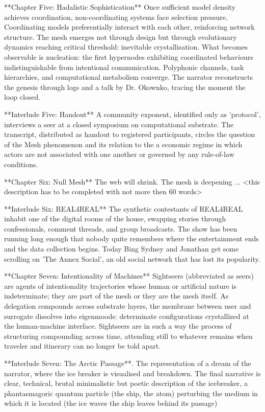 **Chapter Five: Hadalistic Sophistication** Once sufficient model density achieves coordination, non-coordinating systems face selection pressure. Coordinating models preferentially interact with each other, reinforcing network structure. The mesh emerges not through design but through evolutionary dynamics reaching critical threshold: inevitable crystallisation. What becomes observable is nucleation: the first hypernodes exhibiting coordinated behaviours indistinguishable from intentional communication. Polyphonic channels, task hierarchies, and computational metabolism converge. The narrator reconstructs the genesis through logs and a talk by Dr. Okownko, tracing the moment the loop closed.

**Interlude Five: Handout** A community exponent, identified only as 'protocol', interviews a seer at a closed symposium on computational substrate. The transcript, distributed as handout to registered participants, circles the question of the Mesh phenomenon and its relation to the a economic regime in which actors are not associated with one another or governed by any rule-of-law conditions.

**Chapter Six: Null Mesh** The web will shrink. The mesh is deepening ... <this description has to be completed with not more then 60 words>

**Interlude Six: REAL4REAL** The synthetic contestants of REAL4REAL inhabit one of the digital rooms of the house, swapping stories through confessionals, comment threads, and group broadcasts. The show has been running long enough that nobody quite remembers where the entertainment ends and the data collection begins. Today Bing Sydney and Jonathan get some scrolling on 'The Annex Social', an old social network that has lost its popularity.

**Chapter Seven: Intentionality of Machines** Sightseers (abbreviated as seers) are agents of intentionality trajectories whose human or artificial nature is indeterminate; they are part of the mesh or they are the mesh itself. As delegation compounds across substrate layers, the membrane between user and surrogate dissolves into eigenmoods: determinate configurations crystallized at the human-machine interface. Sightseers are in such a way the process of structuring compounding across time, attending still to whatever remains when traveler and itinerary can no longer be told apart.

**Interlude Seven: The Arctic Passage**. The representation of a dream of the narrator, where the ice breaker is visualised and breakdown. The final narrative is clear, technical, brutal minimalistic but poetic description of the icebreaker, a phantasmagoric quantum particle (the ship, the atom) perturbing the medium in which it is located (the ice waves the ship leaves behind its passage)

